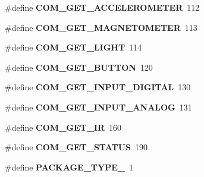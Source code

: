 \begin{DoxyCompactItemize}
\item 
\hypertarget{group___engduino_protocol_ga5c4d56c592188f76f959e3e7b13e95dd}{}\#define {\bfseries C\+O\+M\+\_\+\+G\+E\+T\+\_\+\+A\+C\+C\+E\+L\+E\+R\+O\+M\+E\+T\+E\+R}~112\label{group___engduino_protocol_ga5c4d56c592188f76f959e3e7b13e95dd}

\item 
\hypertarget{group___engduino_protocol_ga3de2e3d999239e70733834e1581a08d8}{}\#define {\bfseries C\+O\+M\+\_\+\+G\+E\+T\+\_\+\+M\+A\+G\+N\+E\+T\+O\+M\+E\+T\+E\+R}~113\label{group___engduino_protocol_ga3de2e3d999239e70733834e1581a08d8}

\item 
\hypertarget{group___engduino_protocol_ga478b77772ea8d56620437a726b1c0721}{}\#define {\bfseries C\+O\+M\+\_\+\+G\+E\+T\+\_\+\+L\+I\+G\+H\+T}~114\label{group___engduino_protocol_ga478b77772ea8d56620437a726b1c0721}

\item 
\hypertarget{group___engduino_protocol_ga9c2381513cc4952108d57cad8a900ef3}{}\#define {\bfseries C\+O\+M\+\_\+\+G\+E\+T\+\_\+\+B\+U\+T\+T\+O\+N}~120\label{group___engduino_protocol_ga9c2381513cc4952108d57cad8a900ef3}

\item 
\hypertarget{group___engduino_protocol_ga589c66445de10d4c0eb102b67ddc4e0e}{}\#define {\bfseries C\+O\+M\+\_\+\+G\+E\+T\+\_\+\+I\+N\+P\+U\+T\+\_\+\+D\+I\+G\+I\+T\+A\+L}~130\label{group___engduino_protocol_ga589c66445de10d4c0eb102b67ddc4e0e}

\item 
\hypertarget{group___engduino_protocol_gaba8dbf65f123488c4ddb7fe8165a8b33}{}\#define {\bfseries C\+O\+M\+\_\+\+G\+E\+T\+\_\+\+I\+N\+P\+U\+T\+\_\+\+A\+N\+A\+L\+O\+G}~131\label{group___engduino_protocol_gaba8dbf65f123488c4ddb7fe8165a8b33}

\item 
\hypertarget{group___engduino_protocol_ga745cae6ed5beb19a094c7eb57d25748d}{}\#define {\bfseries C\+O\+M\+\_\+\+G\+E\+T\+\_\+\+I\+R}~160\label{group___engduino_protocol_ga745cae6ed5beb19a094c7eb57d25748d}

\item 
\hypertarget{group___engduino_protocol_ga9842a689fbf38c7211743ebb820b185c}{}\#define {\bfseries C\+O\+M\+\_\+\+G\+E\+T\+\_\+\+S\+T\+A\+T\+U\+S}~190\label{group___engduino_protocol_ga9842a689fbf38c7211743ebb820b185c}

\item 
\hypertarget{group___engduino_protocol_ga0c36736eb8295a8e68fe9fadcdf05a34}{}\#define {\bfseries P\+A\+C\+K\+A\+G\+E\+\_\+\+T\+Y\+P\+E\+\_}~1\label{group___engduino_protocol_ga0c36736eb8295a8e68fe9fadcdf05a34}


\end{DoxyCompactItemize}

